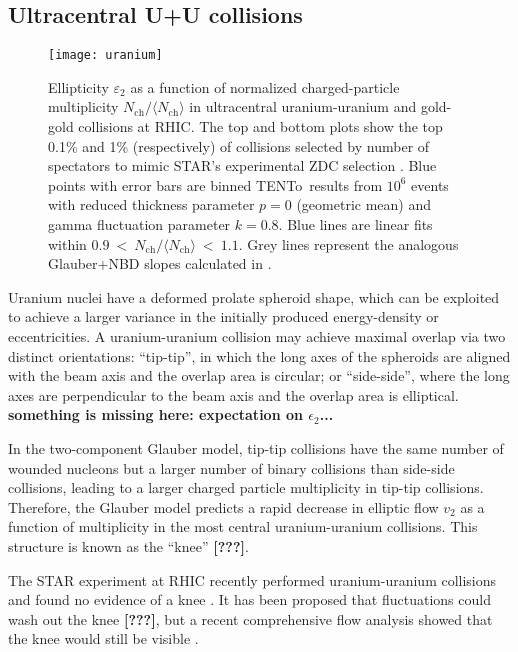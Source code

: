 \documentclass[aps,prl,reprint,amsmath,nofootinbib]{revtex4-1}
\newcommand{\trento}{T\raisebox{-.5ex}{R}ENTo}
\newcommand{\nch}{N_\text{ch}}
\newcommand{\needcite}{\textbf{[???]}}
\begin{document}
\subsection{Ultracentral U+U collisions}

\begin{figure}[t]
  \centering
  \texttt{[image: uranium]}
  \caption{
    \label{fig:uranium}
    Ellipticity $\varepsilon_2$ as a function of normalized charged-particle multiplicity
    $\nch/\langle\nch\rangle$ in ultracentral uranium-uranium and gold-gold collisions at RHIC.  The top and
    bottom plots show the top 0.1\% and 1\% (respectively) of collisions selected by number of spectators to
    mimic STAR's experimental ZDC selection \cite{FortheSTAR:2013bza}.  Blue points with error bars are binned
    \protect\trento\ results from $10^6$ events with reduced thickness parameter $p = 0$ (geometric mean) and
    gamma fluctuation parameter $k = 0.8$.  Blue lines are linear fits within
    $0.9~<~\nch/\langle\nch\rangle~<~1.1$.  Grey lines represent the analogous Glauber+NBD slopes calculated
    in \cite{FortheSTAR:2013bza}.
  }
\end{figure}

Uranium nuclei have a deformed prolate spheroid shape, which can be exploited to achieve a larger variance in the initially produced energy-density or eccentricities. A uranium-uranium collision may achieve maximal
overlap via two distinct orientations:  ``tip-tip'', in which the long axes of the spheroids are aligned with
the beam axis and the overlap area is circular; or ``side-side'', where the long axes are perpendicular to the
beam axis and the overlap area is elliptical. {\bf something is missing here: expectation on $\epsilon_2$...}

In the two-component Glauber model, tip-tip collisions have the same number of wounded nucleons but a larger number of binary
collisions than side-side collisions, leading to a larger charged particle multiplicity in tip-tip collisions.  Therefore, the Glauber model predicts a
rapid decrease in elliptic flow $v_2$ as a function of multiplicity in the most central uranium-uranium
collisions.  This structure is known as the ``knee'' \needcite.

The STAR experiment at RHIC recently performed uranium-uranium collisions and found no evidence of a knee
\cite{FortheSTAR:2013bza}.  It has been proposed that fluctuations could wash out the knee \needcite, but a recent
comprehensive flow analysis showed that the knee would still be visible \cite{osu}.
\end{document}
